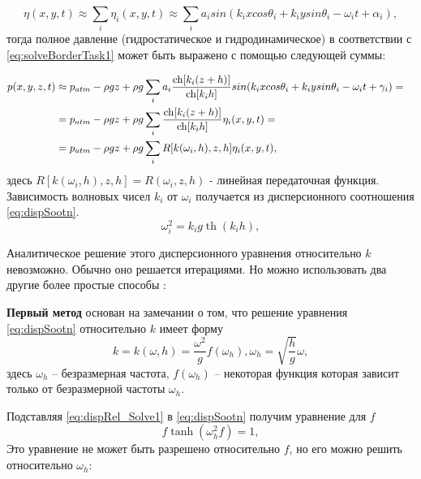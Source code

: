 \begin{equation}\label{eq:approx}
    \eta(x,y,t)\approx\sum\limits_i\eta_i(x,y,t)\approx
    \sum\limits_i a_isin(k_ixcos\theta_i+k_iysin\theta_i-\omega_i t+\alpha_i),
\end{equation}
\noindent
тогда полное давление (гидростатическое и гидродинамическое) в соответствии с \eqref{eq:solveBorderTask1}  может быть выражено с помощью следующей суммы:

\begin{align}\label{eq:approxPress}
    p(x,y,z,t) &\approx p_{atm}-\rho gz+\rho g \sum\limits_i a_i\frac{\operatorname{ch}[k_i(z+h)]}{\operatorname{ch}[k_ih]}sin(k_ixcos\theta_i+k_iysin\theta_i-\omega_i t+\gamma_i)=&\notag\\
    &=p_{atm}-\rho gz+\rho g\sum\limits_i\frac{\operatorname{ch}[k_i(z+h)]}{\operatorname{ch}[k_ih]}\eta_i(x,y,t)=&\\
    &=p_{atm}-\rho gz+\rho g\sum\limits_iR[k(\omega_i,h),z,h]\eta_i(x,y,t),&
\end{align}
\noindent
здесь $R[k(\omega_i,h),z,h]=R(\omega_i,z,h)$ - линейная передаточная функция. Зависимость волновых чисел $k_i$ от $\omega_i$ получается из дисперсионного соотношения \eqref{eq:dispSootn}.
\begin{equation}\label{eq:dispSootn1}
\omega_i^2=k_ig\operatorname{th}(k_ih),
\end{equation}

Аналитическое решение этого дисперсионного уравнения относительно $k$ невозможно. Обычно оно решается итерациями. Но можно использовать два другие более простые способы\cite{kras} \cite{Zasl_Kras_2001}:

\textbf{Первый метод} основан на замечании о том, что решение уравнения \eqref{eq:dispSootn} относительно $k$ имеет форму
\begin{equation}\label{eq:dispRel_Solve1}
  k=k(\omega,h)=\frac{\omega^2}{g}f(\omega_h), \omega_h=\sqrt{\frac{h}{g}}\omega,
\end{equation}
здесь $\omega_h$ -- безразмерная частота, $f(\omega_h)$ -- некоторая функция которая зависит только от безразмерной частоты $\omega_h$.

Подставляя \eqref{eq:dispRel_Solve1} в \eqref{eq:dispSootn} получим уравнение для $f$
$$
f\tanh(\omega_h^2f)=1,
$$
Это уравнение не может быть разрешено относительно $f$, но его можно решить относительно $\omega_h$:

